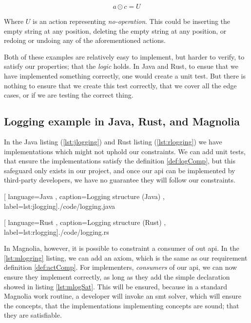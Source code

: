 \begin{definition} \label{def:actComp}
  \begin{equation}
    a \odot c = U
  \end{equation}
\end{definition}

Where $U$ is an action representing \textit{no-operation}. This could be
inserting the empty string at any position, deleting the empty string at any
position, or redoing or undoing any of the aforementioned actions.

Both of these examples are relatively easy to implement, but harder to verify,
to satisfy our properties; that the \textit{logic} holds. In Java and Rust, to
ensue that we have implemented something correctly, one would create a unit
test. But there is nothing to ensure that we create this test correctly, that
we cover all the edge cases, or if we are testing the correct thing.

\subsection{Logging example in Java, Rust, and Magnolia}

In the Java listing (\ref{lst:jlogging}) and Rust listing (\ref{lst:rlogging})
we have implementations which might not uphold our constraints. We can add unit
tests, that ensure the implementations satisfy the definition \ref{def:logComp},
but this safeguard only exists in our project, and once our \gls*{api} can be
implemented by third-party developers, we have no guarantee they will follow our
constraints.

\begin{center}
  
    [ language=Java
    , caption={Logging structure (Java)}
    , label=lst:jlogging]{./code/logging.java}
\end{center}

\begin{center}
  
    [ language=Rust
    , caption={Logging structure (Rust)}
    , label=lst:rlogging]{./code/logging.rs}
\end{center}

In Magnolia, however, it is possible to constraint a consumer of out \gls*{api}.
In the \ref{lst:mlogging} listing, we can add an axiom, which is the same as our
requirement definition \ref{def:actComp}. For implementers, \textit{consumers}
of our \gls*{api}, we can now ensure they implement correctly, as long as they
add the simple declaration showed in listing \ref{lst:mlogSat}. This will be
ensured, because in a standard Magnolia work routine, a developer will invoke an
\gls*{smt} solver, which will ensure the concepts, that the implementations
implementing concepts are sound; that they are satisfiable.


